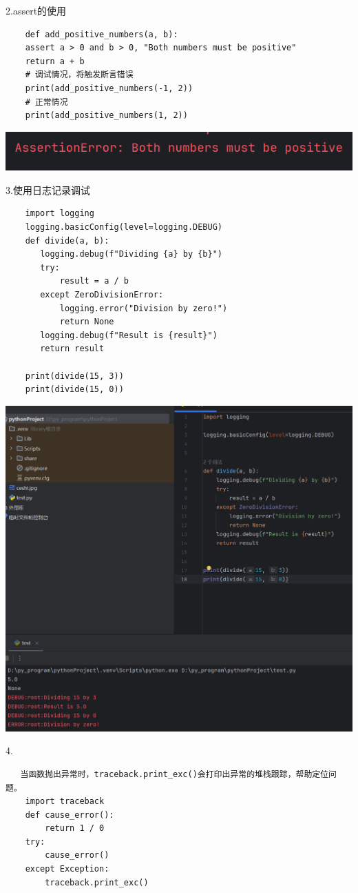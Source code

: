 \documentclass{article}
\begin{document}
2.assert的使用
\begin{verbatim}
	def add_positive_numbers(a, b):
	assert a > 0 and b > 0, "Both numbers must be positive"
	return a + b
	# 调试情况，将触发断言错误
	print(add_positive_numbers(-1, 2))
	# 正常情况
	print(add_positive_numbers(1, 2))
\end{verbatim}


\noindent
\begin{minipage}{\linewidth}
	\centering
	\includegraphics[width=0.5\linewidth]{assert.png}
	\label{fig:example}
\end{minipage}

3.使用日志记录调试
 \begin{verbatim}
    import logging
    logging.basicConfig(level=logging.DEBUG)
    def divide(a, b):
       logging.debug(f"Dividing {a} by {b}")
       try:
           result = a / b
       except ZeroDivisionError:
           logging.error("Division by zero!")
           return None
       logging.debug(f"Result is {result}")
       return result
  
    print(divide(15, 3))
    print(divide(15, 0))
 \end{verbatim}

\noindent
\begin{minipage}{\linewidth}
  \centering
  \includegraphics[width=0.5\linewidth]{rizhijilu.png}
  \label{fig:example}
\end{minipage}

4.
\begin{verbatim}
   当函数抛出异常时，traceback.print_exc()会打印出异常的堆栈跟踪，帮助定位问题。
    import traceback
    def cause_error():
        return 1 / 0
    try:
        cause_error()
    except Exception:
        traceback.print_exc()
\end{verbatim}
\end{document}
